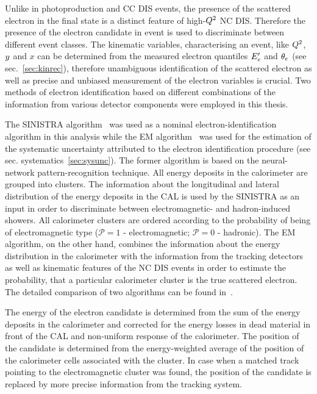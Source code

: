 Unlike in photoproduction and CC DIS events, the presence of the scattered electron in the final state is a distinct feature of high-$\mbox{${Q^2}$}$ NC DIS. Therefore the presence of the electron candidate in event is used to discriminate between different event classes. The kinematic variables, characterising an event, like $\mbox{${Q^2}$}$, $\mbox{${y}$}$ and $x$ can be determined from the measured electron quantiles $\mbox{$E_e'$}$ and $\mbox{$\theta_e$}$ (see sec.~\ref{sec:kinrec}), therefore unambiguous identification of the scattered electron as well as precise and unbiased measurement of the electron variables is crucial. Two methods of electron identification based on different combinations of the information from various detector components were employed in this thesis. 

The SINISTRA algorithm~\cite{nim:a365:508} was used as a nominal electron-identification algorithm in this analysis while the EM algorithm~\cite{epj:c11:427,upub:Straub:url} was used for the estimation of the systematic uncertainty attributed to the electron identification procedure (see sec. systematics~\ref{sec:sysunc}). The former algorithm is based on the neural-network pattern-recognition technique. All energy deposits in the calorimeter are grouped into clusters. The information about the longitudinal and lateral distribution of the energy deposits in the CAL is used by the SINISTRA as an input in order to discriminate between electromagnetic- and hadron-induced showers. All calorimeter clusters are ordered according to the probability of being of electromagnetic type (${\mathcal P}=1$ - electromagnetic; ${\mathcal P=0}$ - hadronic). The EM algorithm, on the other hand, combines the information about the energy distribution in the calorimeter with the information from the tracking detectors as well as kinematic features of the NC DIS events in order to estimate the probability, that a particular calorimeter cluster is the true scattered electron. The detailed comparison of two algorithms can be found in~\cite{upub:schlenstedt:zn9977}.

The energy of the electron candidate is determined from the sum of the energy deposits in the calorimeter and corrected for the energy losses in dead material in front of the CAL and non-uniform response of the calorimeter. The position of the candidate is determined from the energy-weighted average of the position of the calorimeter cells associated with the cluster. In case when a matched track pointing to the electromagnetic cluster was found, the position of the candidate is replaced by more precise information from the tracking system.